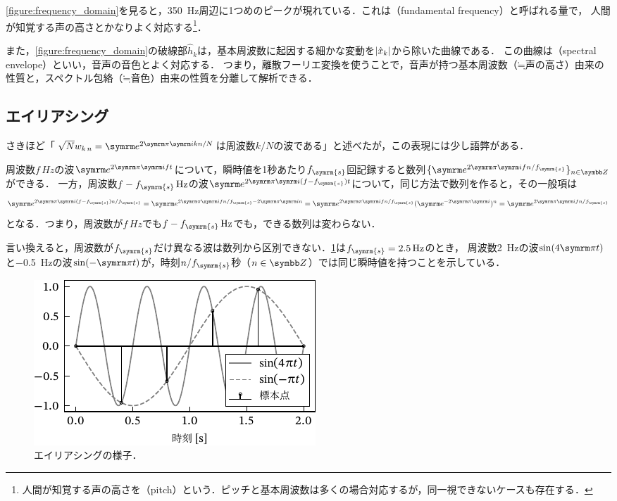 \documentclass[../../main]{subfiles}
\begin{document}
\cref{figure:frequency_domain}を見ると，\SI{350}{Hz}周辺に1つめのピークが現れている．これは（fundamental frequency）と呼ばれる量で，
人間が知覚する声の高さとかなりよく対応する\footnote{人間が知覚する声の高さを（pitch）という．ピッチと基本周波数は多くの場合対応するが，同一視できないケースも存在する\cite{kashino}．}．

また，\cref{figure:frequency_domain}の破線部\(\hat{h}_k\)は，基本周波数に起因する細かな変動を\(\lvert\hat{x}_k\rvert\)から除いた曲線である．
この曲線は（spectral envelope）といい，音声の音色とよく対応する．
つまり，離散フーリエ変換を使うことで，音声が持つ基本周波数（\(\mathord{\fallingdotseq}\text{声の高さ}\)）由来の性質と，スペクトル包絡（\(\mathord{\fallingdotseq}\text{音色}\)）由来の性質を分離して解析できる．

\subsection{エイリアシング}

さきほど「\(\sqrt{N}\midx{w}{k}{n}=\napr^{2\krez\iuni kn/N}\)は周波数\(k/N\)の波である」と述べたが，この表現には少し語弊がある．

周波数\(f\,\si{Hz}\)の波\(\napr^{2\krez\iuni ft}\)について，瞬時値を1秒あたり\(f_{\symrm{s}}\)回記録すると数列\(\seq{\napr^{2\krez\iuni fn/f_{\symrm{s}}}}_{n\in\numset{Z}}\)ができる．
一方，周波数\(f-f_{\symrm{s}}\,\si{Hz}\)の波\(\napr^{2\krez\iuni(f-f_{\symrm{s}})t}\)について，同じ方法で数列を作ると，その一般項は
\[
  \napr^{2\krez\iuni(f-f_{\symrm{s}})n/f_{\symrm{s}}} = \napr^{2\krez\iuni fn/f_{\symrm{s}}-2\krez\iuni n}
  = \napr^{2\krez\iuni fn/f_{\symrm{s}}}(\napr^{-2\krez\iuni})^n
  = \napr^{2\krez\iuni fn/f_{\symrm{s}}}
\]
となる．つまり，周波数が\(f\,\si{Hz}\)でも\(f-f_{\symrm{s}}\,\si{Hz}\)でも，できる数列は変わらない．

言い換えると，周波数が\(f_{\symrm{s}}\)だけ異なる波は数列から区別できない．\cref{figure:aliasing}は\(f_{\symrm{s}}=\SI{2.5}{Hz}\)のとき，
周波数\SI{2}{Hz}の波\(\sin(4\krez t)\)と\SI{-0.5}{Hz}の波\(\sin(-\krez t)\)が，時刻\(n/f_{\symrm{s}}\)秒（\(n\in\numset{Z}\)）では同じ瞬時値を持つことを示している．

\begin{figure}[htbp]
  \centering
  \includegraphics{figures/aliasing.pdf}
  \caption{エイリアシングの様子．}
  \label{figure:aliasing}
\end{figure}
\end{document}
